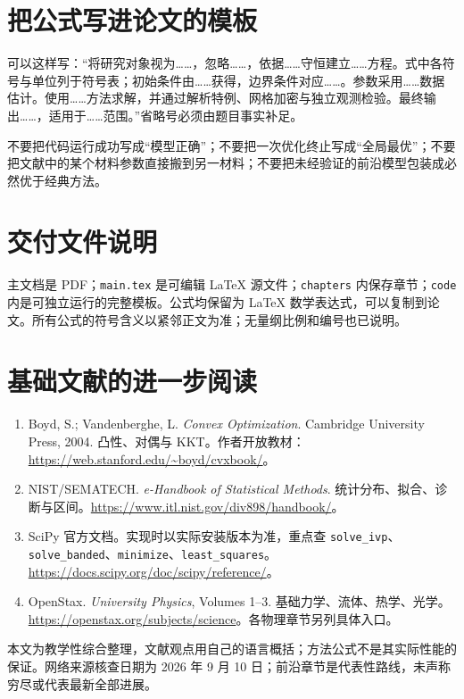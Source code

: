 \section{把公式写进论文的模板}
可以这样写：“将研究对象视为……，忽略……，依据……守恒建立……方程。式中各符号与单位列于符号表；初始条件由……获得，边界条件对应……。参数采用……数据估计。使用……方法求解，并通过解析特例、网格加密与独立观测检验。最终输出……，适用于……范围。”省略号必须由题目事实补足。

不要把代码运行成功写成“模型正确”；不要把一次优化终止写成“全局最优”；不要把文献中的某个材料参数直接搬到另一材料；不要把未经验证的前沿模型包装成必然优于经典方法。

\section{交付文件说明}
主文档是 PDF；\texttt{main.tex} 是可编辑 LaTeX 源文件；\texttt{chapters} 内保存章节；\texttt{code} 内是可独立运行的完整模板。公式均保留为 LaTeX 数学表达式，可以复制到论文。所有公式的符号含义以紧邻正文为准；无量纲比例和编号也已说明。

\section{基础文献的进一步阅读}
\begin{enumerate}
\item Boyd, S.; Vandenberghe, L. \emph{Convex Optimization}. Cambridge University Press, 2004. 凸性、对偶与 KKT。作者开放教材：\url{https://web.stanford.edu/~boyd/cvxbook/}。
\item NIST/SEMATECH. \emph{e-Handbook of Statistical Methods}. 统计分布、拟合、诊断与区间。\url{https://www.itl.nist.gov/div898/handbook/}。
\item SciPy 官方文档。实现时以实际安装版本为准，重点查 \texttt{solve\_ivp}、\texttt{solve\_banded}、\texttt{minimize}、\texttt{least\_squares}。\url{https://docs.scipy.org/doc/scipy/reference/}。
\item OpenStax. \emph{University Physics}, Volumes 1--3. 基础力学、流体、热学、光学。\url{https://openstax.org/subjects/science}。各物理章节另列具体入口。
\end{enumerate}
本文为教学性综合整理，文献观点用自己的语言概括；方法公式不是其实际性能的保证。网络来源核查日期为 2026 年 9 月 10 日；前沿章节是代表性路线，未声称穷尽或代表最新全部进展。
